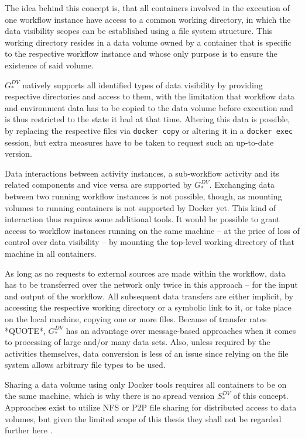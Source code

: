   The idea behind this concept is, that all containers involved in the execution of one workflow instance have access to a common working directory, in which the data visibility scopes can be established using a file system structure. This working directory resides in a data volume owned by a container that is specific to the respective workflow instance and whose only purpose is to ensure the existence of said volume.

  $G_{*}^{DV}$ natively supports all identified types of data visibility by providing respective directories and access to them, with the limitation that workflow data and environment data has to be copied to the data volume before execution and is thus restricted to the state it had at that time. Altering this data is possible, \eg by replacing the respective files via \texttt{docker copy} or altering it in a \texttt{docker exec} session, but extra measures have to be taken to request such an up-to-date version.

  Data interactions between activity instances, a sub-workflow activity and its related components and vice versa are supported by $G_{*}^{DV}$. Exchanging data between two running workflow instances is not possible, though, as mounting volumes to running containers is not supported by Docker yet. This kind of interaction thus requires some additional tools. It would be possible to grant access to workflow instances running on the same machine -- at the price of loss of control over data visibility -- by mounting the top-level working directory of that machine in all containers.

  As long as no requests to external sources are made within the workflow, data has to be transferred over the network only twice in this approach -- for the input and output of the workflow. All subsequent data transfers are either implicit, \eg by accessing the respective working directory or a symbolic link to it, or take place on the local machine, \eg copying one or more files. Because of transfer rates *QUOTE*, $G_{*}^{DV}$ has an advantage over message-based approaches when it comes to processing of large and/or many data sets. Also, unless required by the activities themselves, data conversion is less of an issue since relying on the file system allows arbitrary file types to be used.

  Sharing a data volume using only Docker tools requires all containers to be on the same machine, which is why there is no spread version $S_{*}^{DV}$ of this concept. Approaches exist to utilize \ac{NFS} or \ac{P2P} file sharing for distributed access to data volumes, but given the limited scope of this thesis they shall not be regarded further here \cite{Miell2015How}.

